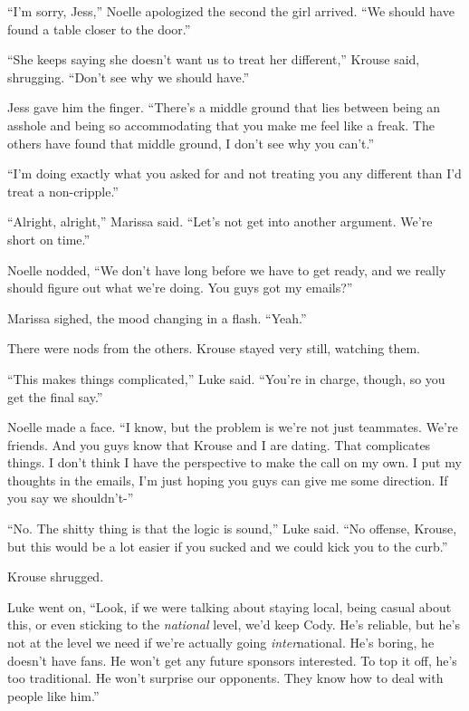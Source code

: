 ``I'm sorry, Jess,'' Noelle apologized the second the girl arrived.  ``We should have found a table closer to the door.''



``She keeps saying she doesn't want us to treat her different,'' Krouse said, shrugging.  ``Don't see why we should have.''



Jess gave him the finger.  ``There's a middle ground that lies between being an asshole and being so accommodating that you make me feel like a freak.  The others have found that middle ground, I don't see why you can't.''



``I'm doing exactly what you asked for and not treating you any different than I'd treat a non-cripple.''



``Alright, alright,'' Marissa said.  ``Let's not get into another argument.  We're short on time.''



Noelle nodded, ``We don't have long before we have to get ready, and we really should figure out what we're doing.  You guys got my emails?''



Marissa sighed, the mood changing in a flash.  ``Yeah.''



There were nods from the others.  Krouse stayed very still, watching them.



``This makes things complicated,'' Luke said.  ``You're in charge, though, so you get the final say.''



Noelle made a face.  ``I know, but the problem is we're not just teammates.  We're friends.  And you guys know that Krouse and I are dating.  That complicates things.  I don't think I have the perspective to make the call on my own.  I put my thoughts in the emails, I'm just hoping you guys can give me some direction.  If you say we shouldn't-''



``No.  The shitty thing is that the logic is sound,'' Luke said.  ``No offense, Krouse, but this would be a lot easier if you sucked and we could kick you to the curb.''



Krouse shrugged.



Luke went on, ``Look, if we were talking about staying local, being casual about this, or even sticking to the \emph{national} level, we'd keep Cody.  He's reliable, but he's not at the level we need if we're actually going \emph{inter}national.  He's boring, he doesn't have fans.  He won't get any future sponsors interested.  To top it off, he's too traditional.  He won't surprise our opponents.  They know how to deal with people like him.''



